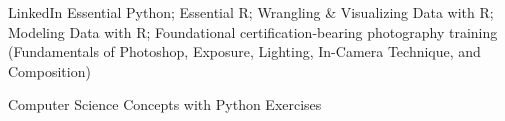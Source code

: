\vspace{-0.5em}


\begin{cvskills}

\cvskill
{LinkedIn} %
{Essential Python; Essential R; Wrangling \& Visualizing Data with R; Modeling Data with R; Foundational certification-bearing photography training (Fundamentals of Photoshop, Exposure, Lighting, In-Camera Technique, and Composition)}


%
{Computer Science Concepts with Python Exercises}




\end{cvskills}